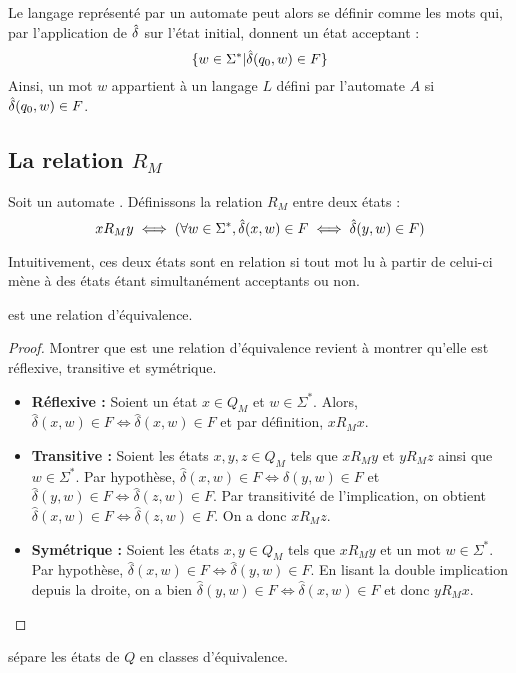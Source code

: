 	 Le langage représenté par un automate \automaton peut alors se définir comme les mots qui, par l'application de $\hat{\delta}$ sur l'état initial, donnent un état acceptant :
	 $$
	 \{w \in \Sigma^* | \hat{\delta}(q_0,w) \in F\}
	 $$
	 Ainsi, un mot $w$ appartient à un langage $L$ défini par l'automate $A$ si $\hat{\delta}(q_0,w) \in F$.	 
	 
	 \subsection{La relation $R_M$}\label{ss:rm}
	 
	 Soit un automate \automaton. Définissons la relation $R_M$ entre deux états : 
	 $$xR_My \iff (\forall w \in \Sigma^*,\hat{\delta}(x,w) \in F \iff \hat{\delta}(y,w) \in F)$$
	 
	 Intuitivement, ces deux états sont en relation si tout mot lu à partir de celui-ci mène à des états étant simultanément acceptants ou non. 
	 
	 \begin{proposition}
	 	\rm est une relation d'équivalence.
	 \end{proposition}
	
	 \begin{proof} Montrer que \rm est une relation d'équivalence revient à montrer qu'elle est réflexive, transitive et symétrique.
	 	\begin{itemize}
	 		\item \textbf{Réflexive :} Soient un état $x \in Q_M$ et $w \in \Sigma^*$. Alors, $\hat{\delta}(x,w) \in F \iff \hat{\delta}(x,w) \in F$ et par définition, $xR_Mx$.
	 		\item \textbf{Transitive :} Soient les états $x,y,z \in Q_M$ tels que $xR_My$ et $yR_Mz$ ainsi que $w \in \Sigma^*$. Par hypothèse, $\hat{\delta}(x,w) \in F \iff \hat{\delta}(y,w)\in F$ et $\hat{\delta}(y,w) \in F\iff \hat{\delta}(z,w) \in F$. Par transitivité de l'implication, on obtient $\hat{\delta}(x,w) \in F \iff \hat{\delta}(z,w)\in F$. On a donc $xR_Mz$.
	 		\item \textbf{Symétrique : } Soient les états $x,y \in Q_M$ tels que $xR_My$ et un mot $w \in \Sigma^*$. Par hypothèse, $\hat{\delta}(x, w)\in F \iff \hat{\delta}(y, w)\in F$. En lisant la double implication depuis la droite, on a bien $\hat{\delta}(y, w) \in F\iff \hat{\delta}(x, w)\in F$ et donc $yR_Mx$.
	 	\end{itemize}
	 \end{proof}
	 
	 \begin{corollary}
	 	\rm sépare les états de $Q$ en classes d'équivalence.
	 \end{corollary}
	 
